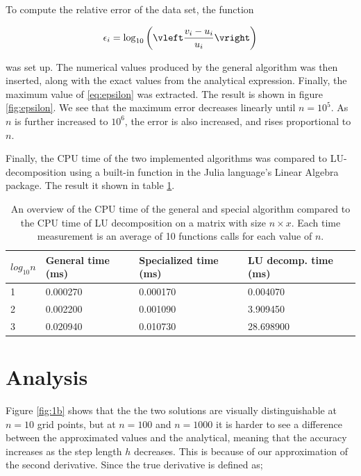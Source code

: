 \documentclass[a4paper,10pt,English]{article}
\begin{document}
To compute the relative error of the data set, the function

\begin{equation}\label{eq:epsilon}
    \epsilon_i = \log_{10} \left( \vleft \frac{v_i - u_i}{u_i} \vright \right)
\end{equation}

was set up. The numerical values produced by the general algorithm was then inserted, along with the exact values from the analytical expression. Finally, the maximum value of \ref{eq:epsilon} was extracted. The result is shown in figure \ref{fig:epsilon}. We see that the maximum error decreases linearly until $n=10^5$. As $n$ is further increased to $10^6$, the error is also increased, and rises proportional to $n$.

Finally, the CPU time of the two implemented algorithms was compared to LU-decomposition using a built-in function in the Julia language's Linear Algebra package. The result it shown in table \ref{tab:LU}. 


\begin{table}[] \label{tab:LU} \centering
\begin{tabular}{|l|l|l|l|}
\hline
$log_{10} n$ & General time (ms) & Specialized time (ms) & LU decomp. time (ms) \\ \hline
1            & 0.000270            & 0.000170                & 0.004070               \\ \hline
2            & 0.002200            & 0.001090                & 3.909450               \\ \hline
3            & 0.020940            & 0.010730                & 28.698900              \\ \hline
\end{tabular}
\caption{An overview of the CPU time of the general and special algorithm compared to the CPU time of LU decomposition on a matrix with size $n\times x$. Each time measurement is an average of 10 functions calls for each value of $n$.}
\end{table}
\section{Analysis}

Figure \ref{fig:1b} shows that the the two solutions are visually distinguishable at $n = 10$ grid points, but at $n = 100$ and $n = 1000$ it is harder to see a difference between the approximated values and the analytical, meaning that the accuracy increases as the step length $h$ decreases. This is because of our approximation of the second derivative. Since the true derivative is defined as;
\end{document}
